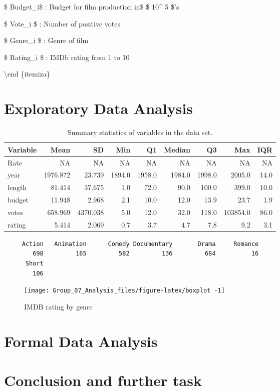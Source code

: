 \documentclass[
]{article}
\begin{document}
\$ Budget\_i\$ : Budget for film production in\$ \$ 10\^{} 5 \$'s

\item

\$ Vote\_i \$ : Number of positive votes

\item

\$ Genre\_i \$ : Genre of film

\item

\$ Rating\_i \$ : IMDb rating from 1 to 10

\textbackslash end \{itemiza\}

\hypertarget{sec:EDA}{%
\section{Exploratory Data Analysis}\label{sec:EDA}}

\begin{table}[!h]

\caption{\label{tab:summary}\label{tab:summary}Summary statistics of variables in the data set.}
\centering
\fontsize{10}{12}\selectfont
\begin{tabular}[t]{lrrrrrrrr}
\toprule
Variable & Mean & SD & Min & Q1 & Median & Q3 & Max & IQR\\
\midrule
Rate & NA & NA & NA & NA & NA & NA & NA & NA\\
year & 1976.872 & 23.739 & 1894.0 & 1958.0 & 1984.0 & 1998.0 & 2005.0 & 14.0\\
length & 81.414 & 37.675 & 1.0 & 72.0 & 90.0 & 100.0 & 399.0 & 10.0\\
budget & 11.948 & 2.968 & 2.1 & 10.0 & 12.0 & 13.9 & 23.7 & 1.9\\
votes & 658.969 & 4370.038 & 5.0 & 12.0 & 32.0 & 118.0 & 103854.0 & 86.0\\
rating & 5.414 & 2.069 & 0.7 & 3.7 & 4.7 & 7.8 & 9.2 & 3.1\\
\bottomrule
\end{tabular}
\end{table}

\begin{verbatim}
     Action   Animation      Comedy Documentary       Drama     Romance 
        698         165         582         136         684          16 
      Short 
        106 
\end{verbatim}

\begin{figure}[H]

{\centering \texttt{[image: Group\_07\_Analysis\_files/figure-latex/boxplot -1]} 

}

\caption{\label{fig:boxplot}  IMDB rating by genre}\label{fig:boxplot }
\end{figure}

\hypertarget{sec:FDA}{%
\section{Formal Data Analysis}\label{sec:FDA}}

\hypertarget{sec:Conclude}{%
\section{Conclusion and further task}\label{sec:Conclude}}
\end{document}
